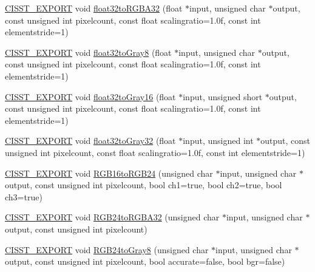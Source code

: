 \begin{DoxyCompactItemize}
\item 
\hyperlink{cmn_export_macros_8h_a99393e0c3ac434b2605235bbe20684f8}{C\+I\+S\+S\+T\+\_\+\+E\+X\+P\+O\+R\+T} void \hyperlink{namespacesvl_converter_a104731e2060e728361a80461b82c09ab}{float32to\+R\+G\+B\+A32} (float $\ast$input, unsigned char $\ast$output, const unsigned int pixelcount, const float scalingratio=1.\+0f, const int elementstride=1)
\item 
\hyperlink{cmn_export_macros_8h_a99393e0c3ac434b2605235bbe20684f8}{C\+I\+S\+S\+T\+\_\+\+E\+X\+P\+O\+R\+T} void \hyperlink{namespacesvl_converter_a66e448744c9ea94d05b30ec84c394a3e}{float32to\+Gray8} (float $\ast$input, unsigned char $\ast$output, const unsigned int pixelcount, const float scalingratio=1.\+0f, const int elementstride=1)
\item 
\hyperlink{cmn_export_macros_8h_a99393e0c3ac434b2605235bbe20684f8}{C\+I\+S\+S\+T\+\_\+\+E\+X\+P\+O\+R\+T} void \hyperlink{namespacesvl_converter_a7da024e110184a47aa479de560d97281}{float32to\+Gray16} (float $\ast$input, unsigned short $\ast$output, const unsigned int pixelcount, const float scalingratio=1.\+0f, const int elementstride=1)
\item 
\hyperlink{cmn_export_macros_8h_a99393e0c3ac434b2605235bbe20684f8}{C\+I\+S\+S\+T\+\_\+\+E\+X\+P\+O\+R\+T} void \hyperlink{namespacesvl_converter_a7436757981689049508c417b721a5f58}{float32to\+Gray32} (float $\ast$input, unsigned int $\ast$output, const unsigned int pixelcount, const float scalingratio=1.\+0f, const int elementstride=1)
\item 
\hyperlink{cmn_export_macros_8h_a99393e0c3ac434b2605235bbe20684f8}{C\+I\+S\+S\+T\+\_\+\+E\+X\+P\+O\+R\+T} void \hyperlink{namespacesvl_converter_a6bb8dfadfd1afdfce623f2b5c452b945}{R\+G\+B16to\+R\+G\+B24} (unsigned char $\ast$input, unsigned char $\ast$output, const unsigned int pixelcount, bool ch1=true, bool ch2=true, bool ch3=true)
\item 
\hyperlink{cmn_export_macros_8h_a99393e0c3ac434b2605235bbe20684f8}{C\+I\+S\+S\+T\+\_\+\+E\+X\+P\+O\+R\+T} void \hyperlink{namespacesvl_converter_ac83ca60b2d7928b474ac25b906be8e41}{R\+G\+B24to\+R\+G\+B\+A32} (unsigned char $\ast$input, unsigned char $\ast$output, const unsigned int pixelcount)
\item 
\hyperlink{cmn_export_macros_8h_a99393e0c3ac434b2605235bbe20684f8}{C\+I\+S\+S\+T\+\_\+\+E\+X\+P\+O\+R\+T} void \hyperlink{namespacesvl_converter_aea475d02307f7b6bd0a4c3b109c2371f}{R\+G\+B24to\+Gray8} (unsigned char $\ast$input, unsigned char $\ast$output, const unsigned int pixelcount, bool accurate=false, bool bgr=false)

\end{DoxyCompactItemize}
